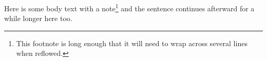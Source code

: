 Here is some body text with a note\footnote{This footnote is long enough that it will need to wrap across several lines when reflowed.} and the sentence continues afterward for a while longer here too.
